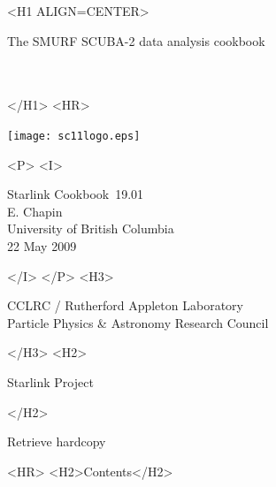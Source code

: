 \documentclass[twoside,11pt]{article}
\newcommand{\stardoccategory}  {Starlink Cookbook}
\newcommand{\stardocsource}    {sc\stardocnumber}
\newcommand{\stardocnumber}    {19.01}
\newcommand{\stardocauthors}   {E. Chapin \\ 
University of British Columbia}
\newcommand{\stardocdate}      {22 May 2009}
\newcommand{\stardoctitle}     {The SMURF SCUBA-2 data analysis cookbook}
\newcommand{\stardocversion}   {\ }
\newcommand{\stardocmanual}    {\ }
\newcommand{\htmladdnormallink}[2]{#1}
\newcommand{\htmladdimg}[1]{}
\newcommand{\htmlref}[2]{#1}
\newcommand{\htmladdtonavigation}[1]{}
\newcommand{\xlabel}[1]{}
\renewcommand{\_}{\texttt{\symbol{95}}}
\begin{document}
\begin{htmlonly}
   \xlabel{}
   \begin{rawhtml} <H1 ALIGN=CENTER> \end{rawhtml}
      \stardoctitle\\
      \stardocversion\\
      \stardocmanual
   \begin{rawhtml} </H1> <HR> \end{rawhtml}

\texttt{[image: sc11\_logo.eps]}

   \begin{rawhtml} <P> <I> \end{rawhtml}
   \stardoccategory\ \stardocnumber \\
   \stardocauthors \\
   \stardocdate
   \begin{rawhtml} </I> </P> <H3> \end{rawhtml}
      \htmladdnormallink{CCLRC}{http://www.cclrc.ac.uk} /
      \htmladdnormallink{Rutherford Appleton Laboratory}
                        {http://www.cclrc.ac.uk/ral} \\
      \htmladdnormallink{Particle Physics \& Astronomy Research 
Council}
                        {http://www.pparc.ac.uk} \\
   \begin{rawhtml} </H3> <H2> \end{rawhtml}
      \htmladdnormallink{Starlink Project}{http://star-www.rl.ac.uk/}
   \begin{rawhtml} </H2> \end{rawhtml}
   \htmladdnormallink{\htmladdimg{source.gif} Retrieve hardcopy}
      {http://star-www.rl.ac.uk/cgi-bin/hcserver?\stardocsource}\\

  \label{stardoccontents}
  \begin{rawhtml} 
    <HR>
    <H2>Contents</H2>
  \end{rawhtml}
  \htmladdtonavigation{\htmlref{\htmladdimg{contents_motif.gif}}
        {stardoccontents}}

\end{htmlonly}
\end{document}
